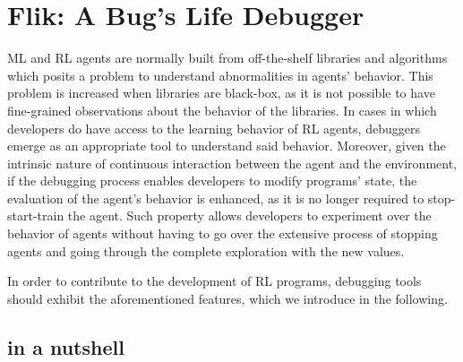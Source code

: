 
\section{Flik: A Bug's Life Debugger}
\label{sec:solution}

\ac{ML} and \ac{RL} agents are normally built from off-the-shelf libraries and algorithms which posits 
a problem to understand abnormalities in agents' behavior. This problem is increased when libraries 
are black-box, as it is not possible to have fine-grained observations about the behavior of the 
libraries. In cases in which developers do have access to the learning behavior of \ac{RL} agents, 
debuggers emerge as an appropriate tool to understand said behavior. Moreover, given the intrinsic 
nature of continuous interaction between the agent and the environment, if the debugging 
process enables developers to modify programs' state, the evaluation of the agent's behavior is 
enhanced, as it is no longer required to stop-start-train the agent. Such property allows developers 
to experiment over the behavior of agents without having to go over the extensive process of 
stopping agents and going through the complete exploration with the new values.

In order to contribute to the development of \ac{RL} programs, 
debugging tools should exhibit the aforementioned features, which we introduce in the following.


\subsection{\flik in a nutshell}
\label{sec:flik-nutshell}

